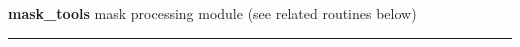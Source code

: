 \begin{modules}
  \begin{sulist}{} %
  \item[\textbf{mask\_tools}] mask processing module (see related routines below)
  \end{sulist}
\end{modules}

\begin{related}
  \begin{sulist}{} %
	\maskToolsRelated
  \end{sulist}
\end{related}

\rule{\hsize}{2mm}

\newpage
